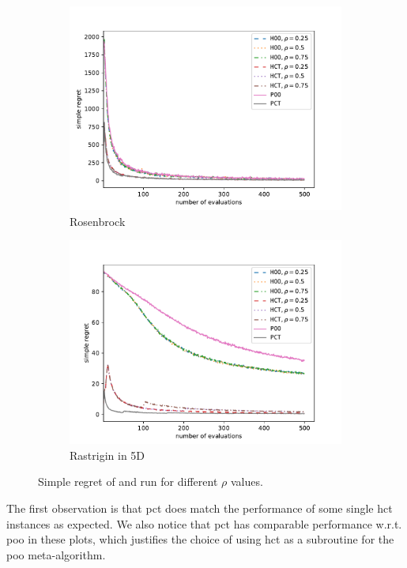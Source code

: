 \begin{figure}[ht]
\begin{subfigure}{0.33\textwidth}
    \centering\includegraphics[width=\textwidth]{Chapter5/img/rosenbrock_plot.pdf}
    \caption{Rosenbrock}
  \end{subfigure}
  \begin{subfigure}{0.33\textwidth}
    \centering\includegraphics[width=\textwidth]{Chapter5/img/rastrigin_plot.pdf}
    \caption{Rastrigin in 5D}
  \end{subfigure}
  \caption{Simple regret of \POO{} and \PCT{} run for different $\rho$ values.}
  \label{fig:results}
\end{figure}

The first observation is that \gls{pct} does match the performance of some single \gls{hct} instances as expected. We also notice that \gls{pct} has comparable performance w.r.t.\,\gls{poo} in these plots, which justifies the choice of using \gls{hct} as a subroutine for the \gls{poo} meta-algorithm.
